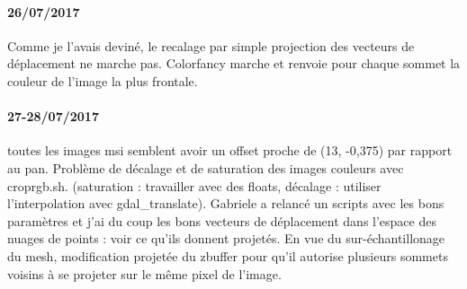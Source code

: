 \documentclass{article}
\begin{document}
\paragraph{26/07/2017} Comme je l'avais deviné, le recalage par simple projection des vecteurs de déplacement ne marche pas. Colorfancy marche et renvoie pour chaque sommet la couleur de l'image la plus frontale.
\paragraph{27-28/07/2017} toutes les images msi  semblent avoir un offset proche de (13, -0,375) par rapport au pan. Problème de décalage et de saturation des images couleurs avec croprgb.sh. (saturation : travailler avec des floats, décalage : utiliser l'interpolation avec gdal\_translate).  Gabriele a relancé un scripts avec les bons paramètres et j'ai du coup les bons vecteurs de déplacement dans l'espace des nuages de points : voir ce qu'ils donnent projetés. En vue du sur-échantillonage du mesh, modification projetée du zbuffer pour qu'il autorise plusieurs sommets voisins à se projeter sur le même pixel de l'image.
\end{document}
